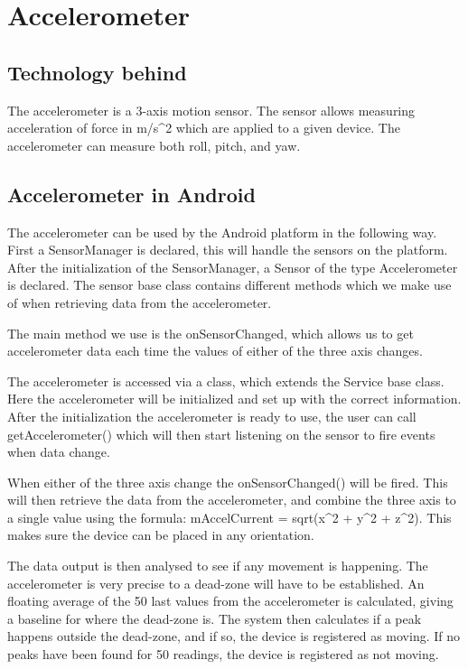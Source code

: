 \section{Accelerometer}

\subsection{Technology behind}
\label{sec:accl}
The accelerometer is a 3-axis motion sensor. The sensor allows measuring acceleration of force in m/s^2 which are applied to a given device. The accelerometer can measure both roll, pitch, and yaw.


\subsection{Accelerometer in Android}
The accelerometer can be used by the Android platform in the following way. First a SensorManager is declared, this will handle the sensors on the platform.
After the initialization of the SensorManager, a Sensor of the type Accelerometer is declared.
The sensor base class contains different methods which we make use of when retrieving data from the accelerometer.

The main method we use is the onSensorChanged, which allows us to get accelerometer data each time the values of either of the three axis changes.

The accelerometer is accessed via a class, which extends the Service base class.
Here the accelerometer will be initialized and set up with the correct information.
After the initialization the accelerometer is ready to use, the user can call getAccelerometer() which will then start listening on the sensor to fire events when data change.

When either of the three axis change the onSensorChanged() will be fired. This will then retrieve the data from the accelerometer, and combine the three axis to a single value using the formula: mAccelCurrent = sqrt(x^2 + y^2 + z^2). This makes sure the device can be placed in any orientation.

The data output is then analysed to see if any movement is happening. The accelerometer is very precise to a dead-zone will have to be established.
An floating average of the 50 last values from the accelerometer is calculated, giving a baseline for where the dead-zone is.
The system then calculates if a peak happens outside the dead-zone, and if so, the device is registered as moving.
If no peaks have been found for 50 readings, the device is registered as not moving.

